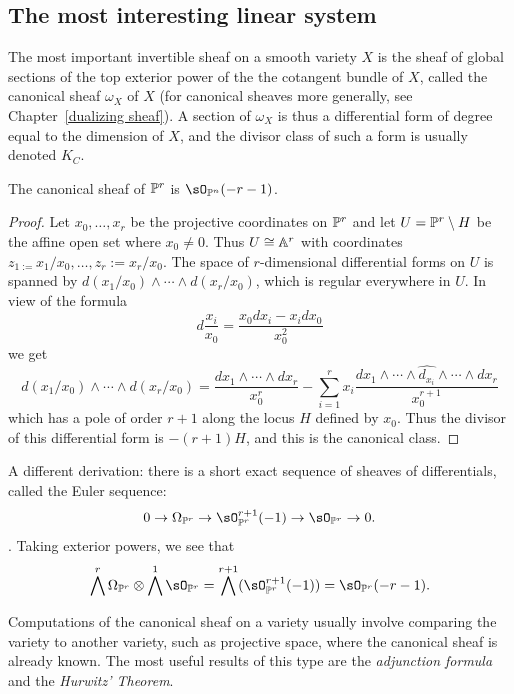 \subsection{The most interesting linear system}

The most important invertible sheaf on a smooth variety $X$ is the sheaf of global sections of the top exterior power of the  the cotangent bundle of $X$, called the canonical sheaf $\omega_X$ of $X$ (for canonical sheaves more generally, see Chapter~\ref{dualizing sheaf}). A section of 
$\omega_X$ is thus a differential form of degree equal to the dimension of $X$, and the divisor class
of such a form is usually denoted $K_C$. 
\begin{theorem}
 The canonical sheaf of $\PP^{r}$ is $\sO_{\PP^{n}}(-r-1)$. 
\end{theorem}
\begin{proof}
Let $x_{0}, \dots, x_{r}$ be the projective coordinates on $\PP^{r}$ and let  $U = \PP^{r}\setminus H$ be the affine open set where $x_{0} \neq 0$. Thus $U \cong \AA^{r}$ with coordinates $z_{1 := }x_{1}/x_{0}, \dots, z_{r}:=x_{r}/x_{0}$. The space of $r$-dimensional differential forms on $U$ is spanned by $d(x_{1}/x_{0})\wedge\cdots\wedge d(x_{r}/x_{0})$, which is regular everywhere in $U$. In view of the formula
$$
d\frac{x_{i}}{x_{0}} = \frac{x_{0}dx_{i}-x_{i}dx_{0}}{x_{0}^{2}}
$$
we get
$$
d(x_{1}/x_{0})\wedge\cdots\wedge d(x_{r}/x_{0}) = \frac{dx_{1}\wedge\cdots\wedge dx_{r}}{x_{0}^{r}}-
\sum_{i=1}^{r} x_{i} \frac{ dx_{1}\wedge\cdots \wedge \widehat{d_{x_{i}}}\wedge \cdots \wedge dx_{r}}{x_{0}^{r+1}}
$$
which has a pole of order $r+1$ along the locus $H$ defined by $x_{0}$. Thus the divisor of this differential form
is $-(r+1)H$, and this is the canonical class.
\end{proof}

\begin{fact}
A different derivation: there is a short exact sequence of sheaves of differentials, called the Euler sequence:
$$
0\to \Omega_{\PP^{r}} \to \sO_{\PP^{r}}^{r+1} (-1) \to \sO_{\PP^{r}} \to 0.
$$. 
Taking exterior powers, we see that
$$
\bigwedge^{r}\Omega_{\PP^{r}} \otimes \bigwedge^{1}\sO_{\PP^{r}} = \bigwedge^{r+1} (\sO_{\PP^{r}}^{r+1} (-1)) = \sO_{\PP^{r}}(-r-1).
$$
\end{fact}

Computations of the canonical sheaf on a variety usually involve comparing the variety to another variety, such as projective space, where the canonical sheaf is already known. The most useful results of this type are  the \emph{adjunction formula}
and the \emph{Hurwitz' Theorem}.

